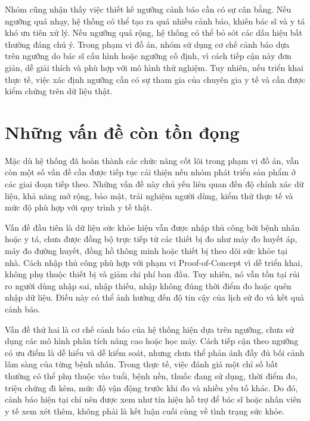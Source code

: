 \par Nhóm cũng nhận thấy việc thiết kế ngưỡng cảnh báo cần có sự cân bằng. Nếu ngưỡng quá nhạy, hệ thống có thể tạo ra quá nhiều cảnh báo, khiến bác sĩ và y tá khó ưu tiên xử lý. Nếu ngưỡng quá rộng, hệ thống có thể bỏ sót các dấu hiệu bất thường đáng chú ý. Trong phạm vi đồ án, nhóm sử dụng cơ chế cảnh báo dựa trên ngưỡng do bác sĩ cấu hình hoặc ngưỡng cố định, vì cách tiếp cận này đơn giản, dễ giải thích và phù hợp với mô hình thử nghiệm. Tuy nhiên, nếu triển khai thực tế, việc xác định ngưỡng cần có sự tham gia của chuyên gia y tế và cần được kiểm chứng trên dữ liệu thật.

\section{Những vấn đề còn tồn đọng}
\par Mặc dù hệ thống đã hoàn thành các chức năng cốt lõi trong phạm vi đồ án, vẫn còn một số vấn đề cần được tiếp tục cải thiện nếu nhóm phát triển sản phẩm ở các giai đoạn tiếp theo. Những vấn đề này chủ yếu liên quan đến độ chính xác dữ liệu, khả năng mở rộng, bảo mật, trải nghiệm người dùng, kiểm thử thực tế và mức độ phù hợp với quy trình y tế thật.

\par Vấn đề đầu tiên là dữ liệu sức khỏe hiện vẫn được nhập thủ công bởi bệnh nhân hoặc y tá, chưa được đồng bộ trực tiếp từ các thiết bị đo như máy đo huyết áp, máy đo đường huyết, đồng hồ thông minh hoặc thiết bị theo dõi sức khỏe tại nhà. Cách nhập thủ công phù hợp với phạm vi Proof-of-Concept vì dễ triển khai, không phụ thuộc thiết bị và giảm chi phí ban đầu. Tuy nhiên, nó vẫn tồn tại rủi ro người dùng nhập sai, nhập thiếu, nhập không đúng thời điểm đo hoặc quên nhập dữ liệu. Điều này có thể ảnh hưởng đến độ tin cậy của lịch sử đo và kết quả cảnh báo.

\par Vấn đề thứ hai là cơ chế cảnh báo của hệ thống hiện dựa trên ngưỡng, chưa sử dụng các mô hình phân tích nâng cao hoặc học máy. Cách tiếp cận theo ngưỡng có ưu điểm là dễ hiểu và dễ kiểm soát, nhưng chưa thể phản ánh đầy đủ bối cảnh lâm sàng của từng bệnh nhân. Trong thực tế, việc đánh giá một chỉ số bất thường có thể phụ thuộc vào tuổi, bệnh nền, thuốc đang sử dụng, thời điểm đo, triệu chứng đi kèm, mức độ vận động trước khi đo và nhiều yếu tố khác. Do đó, cảnh báo hiện tại chỉ nên được xem như tín hiệu hỗ trợ để bác sĩ hoặc nhân viên y tế xem xét thêm, không phải là kết luận cuối cùng về tình trạng sức khỏe.

